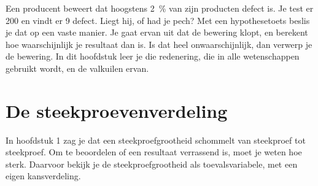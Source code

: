 %



Een producent beweert dat hoogstens 2~\% van zijn producten defect is. Je test er 200 en vindt er 9 defect. Liegt hij, of had je pech? Met een hypothesetoets beslis je dat op een vaste manier. Je gaat ervan uit dat de bewering klopt, en berekent hoe waarschijnlijk je resultaat dan is. Is dat heel onwaarschijnlijk, dan verwerp je de bewering. In dit hoofdstuk leer je die redenering, die in alle wetenschappen gebruikt wordt, en de valkuilen ervan.

\begin{oefeningen}[Start]

\end{oefeningen}


\section{De steekproevenverdeling}

In hoofdstuk 1 zag je dat een steekproefgrootheid schommelt van steekproef tot steekproef. Om te beoordelen of een resultaat verrassend is, moet je weten hoe sterk. Daarvoor bekijk je de steekproefgrootheid als toevalsvariabele, met een eigen kansverdeling.

